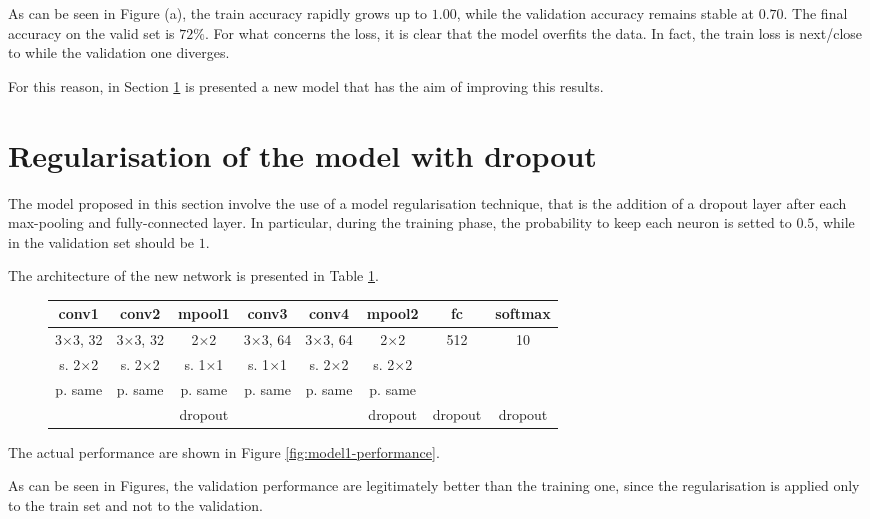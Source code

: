 \documentclass[a4paper,12pt]{article} %
\begin{document}
	As can be seen in Figure (a), the train accuracy rapidly grows up to 
	$1.00$, while the validation accuracy remains stable at $0.70$.  
	The final accuracy on the valid set is $72\%$.
	For what concerns the loss, it is clear that the model overfits the data. 
	In fact, the train loss is next/close to while the validation one diverges.
	
	For this reason, in Section \ref{section:dropout} is presented a new model 
	that has the aim of improving this results.
	
	\section{Regularisation of the model with dropout}
	\label{section:dropout}
	The model proposed in this section involve the use of a model 
	regularisation technique, that is the addition of a dropout layer after 
	each max-pooling and fully-connected layer. In particular, during the 
	training phase, the probability to keep each neuron is setted to $0.5$, 
	while in the validation set should be $1$.	
	
	The architecture of the new network is presented in Table \ref{tab:model1}.	
	
	\begin{figure}[H]
		\centering
		
		\begin{tabular}{cccccccc}
			\toprule
			\textbf{conv1} & \textbf{conv2} & \textbf{mpool1} & 
			\textbf{conv3} &
			\textbf{conv4} & \textbf{mpool2} &   \textbf{fc} &
			\textbf{softmax} \\
			\midrule
			3$\times$3,  32 & 3$\times$3, 32 & 2$\times$2 &3$\times$3, 64 & 
			3$\times$3, 64  & 2$\times$2  & 512 & 10\\
			s. 2$\times$2 &   s. 2$\times$2 &   s. 1$\times$1 & s. 1$\times$1  
			& s. 
			2$\times$2 & s. 2$\times$2 && \\
			p. same & p. same & p. same  & p. same & p. same & p. same &&\\
			 &  & dropout  &  &  & dropout & dropout & dropout\\
			\bottomrule
		\end{tabular}
		\label{tab:model1}
	\end{figure}
	The actual performance are shown in Figure \ref{fig:model1-performance}.
		
	As can be seen in Figures, the validation performance are legitimately 
	better than the training one, since the regularisation is applied only to 
	the train set and not to the validation.
	
\end{document}
